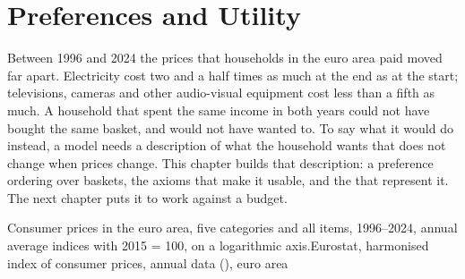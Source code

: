 \chapter{Preferences and Utility}\label{ch:b1:preferences-and-utility}

Between 1996 and 2024 the prices that households in the euro area paid
moved far apart. Electricity cost two and a half times as much at the end
as at the start; televisions, cameras and other audio-visual equipment cost
less than a fifth as much. A household that spent the same income in both
years could not have bought the same basket, and would not have wanted to.
To say what it would do instead, a model needs a description of what the
household wants that does not change when prices change. This chapter
builds that description: a preference ordering over baskets, the axioms
that make it usable, and the  that represent it. The
next chapter puts it to work against a budget.

\begin{openingchart}{Consumer prices in the euro area, five categories and all
items, 1996--2024, annual average indices with 2015 = 100, on a logarithmic
axis.}{Eurostat, harmonised index of consumer prices, annual data
(), euro area}
\end{openingchart}

